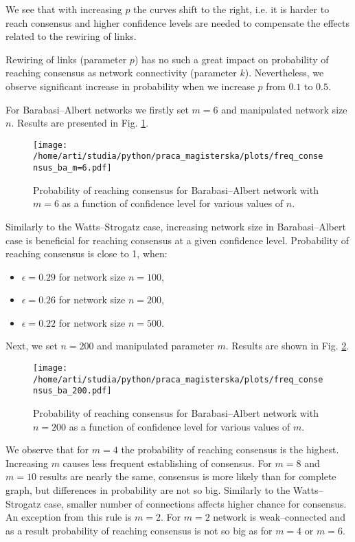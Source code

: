 \documentclass[a4paper, 12pt]{article}
\begin{document}
We see that with increasing $p$ the curves shift to the right, i.e. it is harder to reach consensus and higher confidence levels are needed to compensate the effects related to the rewiring of links.

Rewiring of links (parameter $p$) has no such a great impact on probability of reaching consensus as network connectivity (parameter $k$). Nevertheless, we observe significant increase in probability when we increase $p$ from $0.1$ to $0.5$.

\indent

For Barabasi--Albert networks we firstly set $m=6$ and manipulated network size $n$. Results are presented in Fig. \ref{f13}.

\begin{figure}[H]
		\centering
		\texttt{[image: /home/arti/studia/python/praca\_magisterska/plots/freq\_consensus\_ba\_m=6.pdf]}
		\caption{Probability of reaching consensus for Barabasi--Albert network with $m=6$ as a function of confidence level for various values of $n$.}
		\label{f13}
\end{figure}

Similarly to the Watts--Strogatz case, increasing network size in Barabasi--Albert case is beneficial for reaching consensus at a given confidence level. Probability of reaching consensus is close to 1, when:
\begin{itemize}
\item  $\epsilon=0.29$ for network size $n=100$,
\item  $\epsilon=0.26$ for network size $n=200$,
\item  $\epsilon=0.22$ for network size $n=500$.
\end{itemize}

\indent

Next, we set $n=200$ and manipulated parameter $m$. Results are shown in Fig. \ref{freq_ba}.

\begin{figure}[H]
		\centering
		\texttt{[image: /home/arti/studia/python/praca\_magisterska/plots/freq\_consensus\_ba\_200.pdf]}
		\caption{Probability of reaching consensus for Barabasi--Albert network with $n=200$ as a function of confidence level for various values of $m$.}
		\label{freq_ba}
\end{figure}

We observe that for $m=4$ the probability of reaching   consensus is the highest. Increasing $m$ causes less frequent establishing of consensus. For $m=8$ and $m=10$ results are nearly the same, consensus is more likely than for complete graph, but differences in probability are not so big. Similarly to the Watts--Strogatz case, smaller number of connections affects higher chance for consensus. An exception from this rule is $m=2$. For $m=2$ network is weak--connected and as a result probability of reaching consensus is not so big as for $m=4$ or $m=6$.
\end{document}
